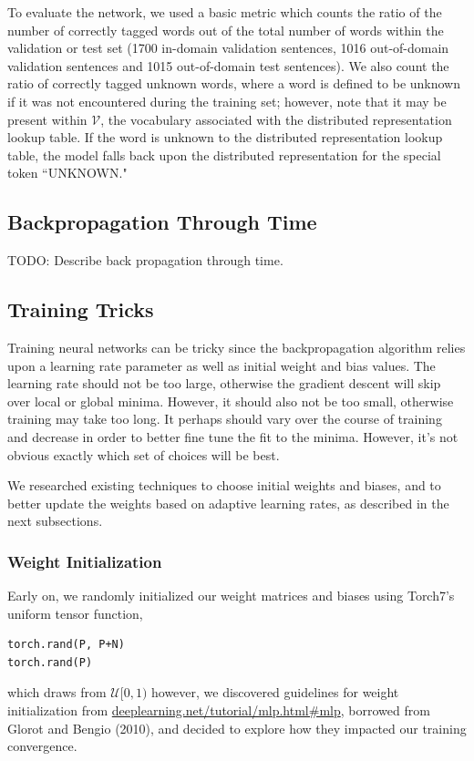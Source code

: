 \documentclass[11pt]{article}
\begin{document}
To evaluate the network, we used a basic metric which counts the ratio of the number of correctly tagged words out of the total number of words within the validation or test set (1700 in-domain validation sentences, 1016 out-of-domain validation sentences and 1015 out-of-domain test sentences). We also count the ratio of correctly tagged unknown words, where a word is defined to be unknown if it was not encountered during the training set; however, note that it may be present within $\mathcal{V}$, the vocabulary associated with the distributed representation lookup table. If the word is unknown to the distributed representation lookup table, the model falls back upon the distributed representation for the special token ``UNKNOWN."

\subsection{Backpropagation Through Time}

TODO: Describe back propagation through time.

\subsection{Training Tricks}

Training neural networks can be tricky since the backpropagation algorithm relies upon a learning rate parameter as well as initial weight and bias values. The learning rate should not be too large, otherwise the gradient descent will skip over local or global minima. However, it should also not be too small, otherwise training may take too long. It perhaps should vary over the course of training and decrease in order to better fine tune the fit to the minima. However, it's not obvious exactly which set of choices will be best.

We researched existing techniques to choose initial weights and biases, and to better update the weights based on adaptive learning rates, as described in the next subsections.

\subsubsection{Weight Initialization}

Early on, we randomly initialized our weight matrices and biases using Torch7's uniform tensor function,
\begin{lstlisting}
torch.rand(P, P+N)
torch.rand(P)
\end{lstlisting}
which draws from $\mathcal{U}[0, 1)$ however, we discovered guidelines for weight initialization from \hyperlink{http://deeplearning.net/tutorial/mlp.html\#mlp}{deeplearning.net/tutorial/mlp.html\#mlp}, borrowed from Glorot and Bengio (2010), and decided to explore how they impacted our training convergence.
\end{document}
